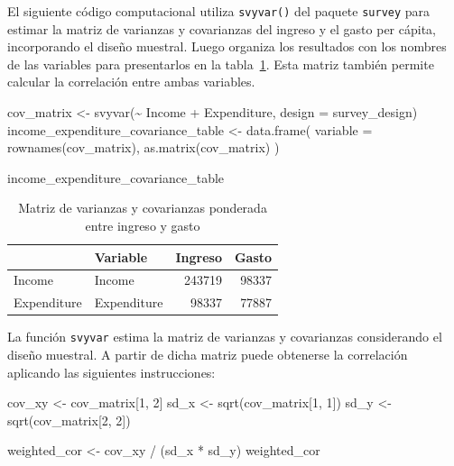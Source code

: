 \documentclass[
  spanish,
  11pt,
  letterpaper,
  oneside,
  open=any]{scrbook}
\newenvironment{Shaded}{\begin{snugshade}}{\end{snugshade}}
\newcommand{\AttributeTok}[1]{\textcolor[rgb]{0.40,0.45,0.13}{#1}}
\newcommand{\DecValTok}[1]{\textcolor[rgb]{0.68,0.00,0.00}{#1}}
\newcommand{\FunctionTok}[1]{\textcolor[rgb]{0.28,0.35,0.67}{#1}}
\newcommand{\NormalTok}[1]{\textcolor[rgb]{0.00,0.23,0.31}{#1}}
\newcommand{\OtherTok}[1]{\textcolor[rgb]{0.00,0.23,0.31}{#1}}
\newcommand{\SpecialCharTok}[1]{\textcolor[rgb]{0.37,0.37,0.37}{#1}}
\begin{document}
El siguiente código computacional utiliza \texttt{svyvar()} del paquete
\texttt{survey} para estimar la matriz de varianzas y covarianzas del
ingreso y el gasto per cápita, incorporando el diseño muestral. Luego
organiza los resultados con los nombres de las variables para
presentarlos en la tabla~\ref{tbl-covarianza}. Esta matriz también
permite calcular la correlación entre ambas variables.

\begin{Shaded}
\begin{Highlighting}[]
\NormalTok{cov\_matrix }\OtherTok{\textless{}{-}} \FunctionTok{svyvar}\NormalTok{(}\SpecialCharTok{\textasciitilde{}}\NormalTok{ Income }\SpecialCharTok{+}\NormalTok{ Expenditure, }\AttributeTok{design =}\NormalTok{ survey\_design)}
\NormalTok{income\_expenditure\_covariance\_table }\OtherTok{\textless{}{-}} \FunctionTok{data.frame}\NormalTok{(}
  \AttributeTok{variable =} \FunctionTok{rownames}\NormalTok{(cov\_matrix),}
  \FunctionTok{as.matrix}\NormalTok{(cov\_matrix)}
\NormalTok{)}

\NormalTok{income\_expenditure\_covariance\_table}
\end{Highlighting}
\end{Shaded}

{

\begin{longtable}[]{@{}llrr@{}}

\caption{\label{tbl-covarianza}Matriz de varianzas y covarianzas
ponderada entre ingreso y gasto}

\tabularnewline

\toprule\noalign{}
& Variable & Ingreso & Gasto \\
\midrule\noalign{}
\endhead
\bottomrule\noalign{}
\endlastfoot
Income & Income & 243719 & 98337 \\
Expenditure & Expenditure & 98337 & 77887 \\

\end{longtable}

}

La función \texttt{svyvar} estima la matriz de varianzas y covarianzas
considerando el diseño muestral. A partir de dicha matriz puede
obtenerse la correlación aplicando las siguientes instrucciones:

\begin{Shaded}
\begin{Highlighting}[]
\NormalTok{cov\_xy }\OtherTok{\textless{}{-}}\NormalTok{ cov\_matrix[}\DecValTok{1}\NormalTok{, }\DecValTok{2}\NormalTok{]}
\NormalTok{sd\_x }\OtherTok{\textless{}{-}} \FunctionTok{sqrt}\NormalTok{(cov\_matrix[}\DecValTok{1}\NormalTok{, }\DecValTok{1}\NormalTok{])}
\NormalTok{sd\_y }\OtherTok{\textless{}{-}} \FunctionTok{sqrt}\NormalTok{(cov\_matrix[}\DecValTok{2}\NormalTok{, }\DecValTok{2}\NormalTok{])}

\NormalTok{weighted\_cor }\OtherTok{\textless{}{-}}\NormalTok{ cov\_xy }\SpecialCharTok{/}\NormalTok{ (sd\_x }\SpecialCharTok{*}\NormalTok{ sd\_y)}
\NormalTok{weighted\_cor}
\end{Highlighting}
\end{Shaded}
\end{document}

